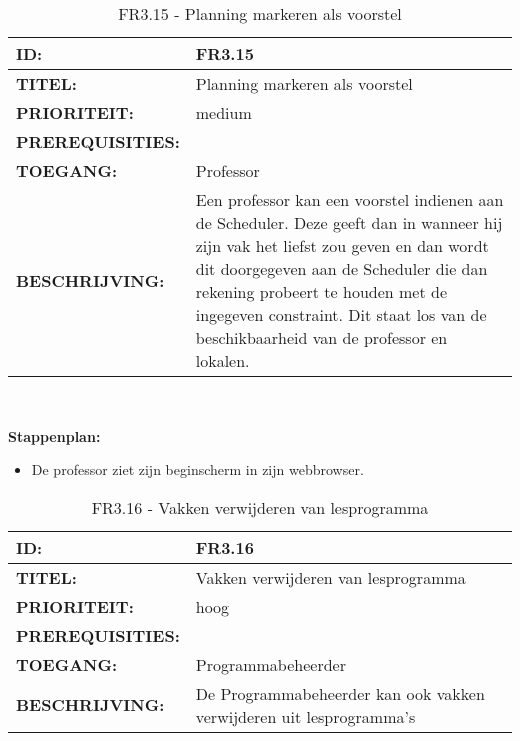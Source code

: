 \noindent\begin{table}[H]
            \begin{tabular}{l | p{10cm}}
                \textbf{ID:} & FR3.15 \\ \hline
                \textbf{TITEL:} & Planning markeren als voorstel\\ \hline
                \textbf{PRIORITEIT:} &  medium \\ \hline
                \textbf{PREREQUISITIES:} & \\ \hline
                \textbf{TOEGANG:} & Professor \\ \hline
                \textbf{BESCHRIJVING:} & Een professor kan een voorstel indienen aan de Scheduler. 
                                        Deze geeft dan in wanneer hij zijn vak het liefst zou geven en dan wordt dit doorgegeven aan de Scheduler die dan rekening probeert te houden met de ingegeven constraint. Dit staat los van de beschikbaarheid van de professor en lokalen.  \\
            \end{tabular}\\
            \caption{FR3.15 - Planning markeren als voorstel}
            \label{tab:FR3.15 - Planning markeren als voorstel}
        \end{table}

\textbf{Stappenplan:}
\begin{itemize}
\item De professor ziet zijn beginscherm in zijn webbrowser. 
\end{itemize}

\noindent\begin{table}[H]
            \begin{tabular}{l | p{10cm}}
                \textbf{ID:} & FR3.16 \\ \hline
                \textbf{TITEL:} & Vakken verwijderen van lesprogramma\\ \hline
                \textbf{PRIORITEIT:} &  hoog \\ \hline
                \textbf{PREREQUISITIES:} & \\ \hline
                \textbf{TOEGANG:} & Programmabeheerder \\ \hline
                \textbf{BESCHRIJVING:} & De Programmabeheerder kan ook vakken verwijderen uit lesprogramma’s \\ 
            \end{tabular}\\
            \caption{FR3.16 - Vakken verwijderen van lesprogramma}
            \label{tab:FR3.16 - Vakken verwijderen van lesprogramma}
        \end{table}

